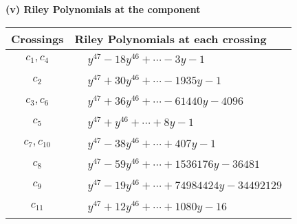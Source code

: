 \documentclass[1p]{elsarticle_modified}
\theoremstyle{definition}
\begin{document}
\newpage\renewcommand{\arraystretch}{1}
\flushleft \textbf{(v) Riley Polynomials at the component}\newline \\
\begin{tabular}{m{50pt}|m{274pt}}
Crossings & \hspace{64pt}Riley Polynomials at each crossing \\
\hline $$\begin{aligned}c_{1},c_{4}\end{aligned}$$&$\begin{aligned}
&y^{47}-18 y^{46}+\cdots-3 y-1
\end{aligned}$\\
\hline $$\begin{aligned}c_{2}\end{aligned}$$&$\begin{aligned}
&y^{47}+30 y^{46}+\cdots-1935 y-1
\end{aligned}$\\
\hline $$\begin{aligned}c_{3},c_{6}\end{aligned}$$&$\begin{aligned}
&y^{47}+36 y^{46}+\cdots-61440 y-4096
\end{aligned}$\\
\hline $$\begin{aligned}c_{5}\end{aligned}$$&$\begin{aligned}
&y^{47}+y^{46}+\cdots+8 y-1
\end{aligned}$\\
\hline $$\begin{aligned}c_{7},c_{10}\end{aligned}$$&$\begin{aligned}
&y^{47}-38 y^{46}+\cdots+407 y-1
\end{aligned}$\\
\hline $$\begin{aligned}c_{8}\end{aligned}$$&$\begin{aligned}
&y^{47}-59 y^{46}+\cdots+1536176 y-36481
\end{aligned}$\\
\hline $$\begin{aligned}c_{9}\end{aligned}$$&$\begin{aligned}
&y^{47}-19 y^{46}+\cdots+74984424 y-34492129
\end{aligned}$\\
\hline $$\begin{aligned}c_{11}\end{aligned}$$&$\begin{aligned}
&y^{47}+12 y^{46}+\cdots+1080 y-16
\end{aligned}$\\
\hline
\end{tabular}\\~\\
\end{document}
